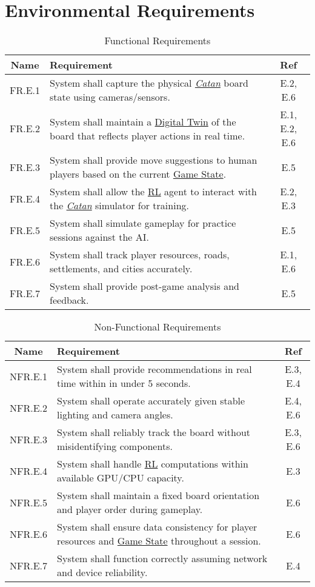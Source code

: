 \documentclass{article}
\newcommand{\Catan}{\href{https://en.wikipedia.org/wiki/Catan}{Catan}}
\newcommand{\RL}{\href{https://www.ibm.com/think/topics/reinforcement-learning}{RL}}
\newcommand{\DigitalTwin}{\href{https://en.wikipedia.org/wiki/Digital_twin}{Digital Twin}}
\newcommand{\GameState}{\href{https://milvus.io/ai-quick-reference/what-is-a-state-in-rl}{Game State}}
\begin{document}
\section*{Environmental Requirements}
\begin{table}[h!]
    \centering
    \begin{tabular}{|c|p{10cm}|c|}
    \hline
    \textbf{Name} & \textbf{Requirement} & \textbf{Ref} \\
    \hline
    FR.E.1 & System shall capture the physical \emph{\Catan{}} board state using cameras/sensors. & E.2, E.6 \\
    \hline
    FR.E.2 & System shall maintain a \DigitalTwin{} of the board that reflects player actions in real time. & E.1, E.2, E.6 \\
    \hline
    FR.E.3 & System shall provide move suggestions to human players based on the current \GameState{}. & E.5 \\
    \hline
    FR.E.4 & System shall allow the \RL{} agent to interact with the \emph{\Catan{}} simulator for training. & E.2, E.3 \\
    \hline
    FR.E.5 & System shall simulate gameplay for practice sessions against the AI. & E.5 \\
    \hline
    FR.E.6 & System shall track player resources, roads, settlements, and cities accurately. & E.1, E.6 \\
    \hline
    FR.E.7 & System shall provide post-game analysis and feedback. & E.5 \\
    \hline
    \end{tabular}
    \caption{Functional Requirements}
    \label{tab:fr}
    \end{table}
    
    
    \begin{table}[h!]
    \centering
    \begin{tabular}{|c|p{10cm}|c|}
    \hline
    \textbf{Name} & \textbf{Requirement} & \textbf{Ref} \\
    \hline
    NFR.E.1 & System shall provide recommendations in real time within in under 5 seconds. & E.3, E.4 \\
    \hline
    NFR.E.2 & System shall operate accurately given stable lighting and camera angles. & E.4, E.6 \\
    \hline
    NFR.E.3 & System shall reliably track the board without misidentifying components. & E.3, E.6 \\
    \hline
    NFR.E.4 & System shall handle \RL{} computations within available GPU/CPU capacity. & E.3 \\
    \hline
    NFR.E.5 & System shall maintain a fixed board orientation and player order during gameplay. & E.6 \\
    \hline
    NFR.E.6 & System shall ensure data consistency for player resources and \GameState{} throughout a session. & E.6 \\
    \hline
    NFR.E.7 & System shall function correctly assuming network and device reliability. & E.4 \\
    \hline
    \end{tabular}
    \caption{Non-Functional Requirements}
    \label{tab:nfr}
    \end{table}
    
\end{document}
